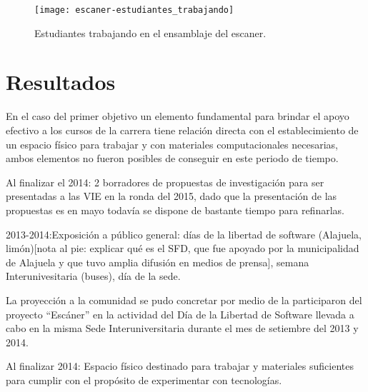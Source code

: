 \documentclass[conference]{IEEEtran}
\begin{document}
\begin{figure}[!t]
\centering
\texttt{[image: escaner-estudiantes\_trabajando]}
\caption{Estudiantes trabajando en el ensamblaje del escaner.}
\label{escaner}
\end{figure}




\section{Resultados}

En el caso del primer objetivo un elemento fundamental para brindar el apoyo efectivo a los cursos de la carrera tiene relación directa con el establecimiento de un espacio físico para trabajar y con materiales computacionales necesarias, ambos elementos no fueron posibles de conseguir en este periodo de tiempo. 



Al finalizar el 2014: 2 borradores de propuestas de investigación para ser presentadas a las VIE en la ronda del 2015, dado que la presentación de las propuestas es en mayo todavía se dispone de bastante tiempo para refinarlas. 

2013-2014:Exposición a público general: días de la libertad de software (Alajuela, limón)[nota al pie: explicar qué es el SFD, que fue apoyado por la municipalidad de Alajuela y que tuvo amplia difusión en medios de prensa], semana Interunivesitaria (buses), día de la sede. 

La proyección a la comunidad se pudo concretar por medio de la participaron del proyecto “Escáner” en la actividad del Día de la Libertad de Software llevada a cabo en la misma Sede Interuniversitaria durante el mes de setiembre del 2013 y 2014.

Al finalizar 2014: Espacio físico destinado para trabajar y materiales suficientes para cumplir con el propósito de experimentar con tecnologías.  
\end{document}
